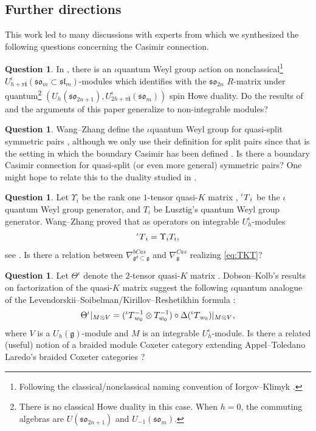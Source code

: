 \documentclass[10pt]{amsart}
\numberwithin{equation}{section}
\theoremstyle{definition}
\newtheorem{question}[theorem]{Question}
\newcommand{\slm}{\mathfrak{sl}_{m}}
\newcommand{\son}[1][2n]{\mathfrak{so}_{#1}}
\newcommand{\som}[1][m]{\mathfrak{so}_{#1}}
\newcommand{\iQW}{\prescript{\iota}{}{T}}
\newcommand{\imag}{\textbf{i}}
\newcommand{\g}{\mathfrak{g}}
\begin{document}
\subsection{Further directions}

This work led to many discussions with experts from which we synthesized the following questions concerning the Casimir connection.

\begin{question}
    In \cite{BER, bodish2026typebwebs}, there is an $\iota$quantum Weyl group action on nonclassical\footnote{Following the classical/nonclassical naming convention of Iorgov--Klimyk \cite{MR2143754}.} $U_{h+\pi \imag}^{\iota}(\som\subset \slm)$-modules which identifies with the $\son$ $R$-matrix under quantum\footnote{There is no classical Howe duality in this case. When $h=0$, the commuting algebras are $U(\son[2n+1])$ and $U_{-1}(\som)$.} $(U_{h}(\son[2n+1]), U_{2h+\pi \imag}^{\iota}(\som))$ spin Howe duality. Do the results of \cite{MR4983792} and the arguments of this paper generalize to non-integrable modules?
\end{question}

\begin{question}\label{quest:quasisplit}
    Wang--Zhang define the $\iota$quantum Weyl group for quasi-split symmetric pairs \cite{WW25}, although we only use their definition for split pairs since that is the setting in which the boundary Casimir has been defined \cite{MR4983792}. Is there a boundary Casimir connection for quasi-split (or even more general) symmetric pairs? One might hope to relate this to the duality studied in \cite{MR5020472}.
\end{question}

\begin{question}
Let $\Upsilon_i$ be the rank one $1$-tensor quasi-$K$ matrix \cite{MR3864017,MR3905136}, $\iQW_i$ be the $\iota$quantum Weyl group generator, and $T_i$ be Lusztig's quantum Weyl group generator. Wang--Zhang proved that as operators on integrable $U_{h}^{\iota}$-modules 
\begin{equation}\label{eq:TKT}
\iQW_i = \Upsilon_iT_i,
\end{equation}
see \cite[Theorem B]{WW25}. Is there a relation between $\nabla_{\g^{\theta}\subset \g}^{bCas}$ and $\nabla_{\g}^{Cas}$ realizing \eqref{eq:TKT}?
\end{question}

\begin{question}
    Let $\Theta^{\iota}$ denote the $2$-tensor quasi-$K$ matrix \cite[Equation 3.1]{MR3864017}. Dobson--Kolb's results on factorization of the quasi-$K$ matrix \cite{MR4021849} suggest the following $\iota$quantum analogue of the Levendorskii--Soibelman/Kirillov--Reshetikhin formula \cite{KirResh, MR1142216}:
    \[
\Theta^{\iota}|_{M\otimes V}= (\iQW_{w_0}^{-1}\otimes T_{w_0}^{-1})\circ \Delta(\iQW_{w_0})|_{M\otimes V},
    \]
    where $V$ is a $U_h(\g)$-module and $M$ is an integrable $U_h^{\iota}$-module. Is there a related (useful) notion of a braided module Coxeter category extending Appel--Toledano Laredo's braided Coxeter categories \cite{MR3984102}?
\end{question}
\end{document}
